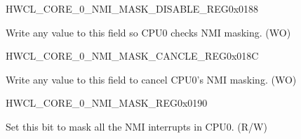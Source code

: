 \begin{register}{H}{WCL\_CORE\_0\_NMI\_MASK\_DISABLE\_REG}{0x{}0188}\label{regdesc:WCLCORE0NMIMASKDISABLEREG}
%
\regnewline%
\begin{regdesc}\begin{reglist}
\label{fielddesc:WCLCORE0NMIMASKDISABLE}\item [WCL\_CORE\_0\_NMI\_MASK\_DISABLE] Write any value to this field so CPU0 checks NMI masking. (WO)
\end{reglist}\end{regdesc}
\end{register}


\begin{register}{H}{WCL\_CORE\_0\_NMI\_MASK\_CANCLE\_REG}{0x{}018C}\label{regdesc:WCLCORE0NMIMASKCANCLEREG}
%
\regnewline%
\begin{regdesc}\begin{reglist}
\label{fielddesc:WCLCORE0NMIMASKCANCEL}\item [WCL\_CORE\_0\_NMI\_MASK\_CANCEL] Write any value to this field to cancel CPU0's NMI masking. (WO)
\end{reglist}\end{regdesc}
\end{register}


\begin{register}{H}{WCL\_CORE\_0\_NMI\_MASK\_REG}{0x{}0190}\label{regdesc:WCLCORE0NMIMASKREG}
%
%
\regnewline%
\begin{regdesc}\begin{reglist}
\label{fielddesc:WCLCORE0NMIMASK}\item [WCL\_CORE\_0\_NMI\_MASK] Set this bit to mask all the NMI interrupts in CPU0. (R/W)
\end{reglist}\end{regdesc}
\end{register}


